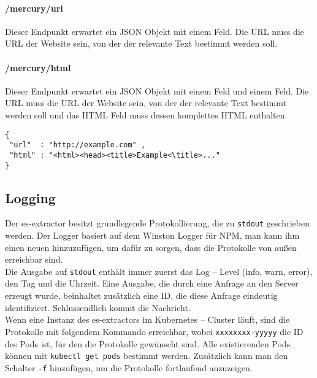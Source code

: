 \paragraph{/mercury/url} Dieser Endpunkt erwartet ein \ac{JSON} Objekt mit einem  Feld. Die URL muss die URL der Website sein, von der der relevante Text bestimmt werden soll.
\paragraph{/mercury/html} Dieser Endpunkt erwartet ein \ac{JSON} Objekt mit einem  Feld und einem  Feld. Die URL muss die URL der Website sein, von der der relevante Text bestimmt werden soll und das HTML Feld muss dessen komplettes HTML enthalten.
\begin{verbatim}
{
 "url"  : "http://example.com" , 
 "html" : "<html><head><title>Example<\title>..."
}
\end{verbatim}

\subsection{Logging}
Der es-extractor besitzt grundlegende Protokollierung, die zu \verb|stdout| geschrieben werden. Der Logger basiert auf dem Winston Logger für NPM, man kann ihm einen neuen  hinzuzufügen, um dafür zu sorgen, dass die Protokolle von außen erreichbar sind. \cite{winston2019} \\ 
Die Ausgabe auf \verb|stdout| enthält immer zuerst das Log – Level (info, warn, error), den Tag und die Uhrzeit. Eine Ausgabe, die durch eine Anfrage an den Server erzeugt wurde, beinhaltet zusätzlich eine ID, die diese Anfrage eindeutig identifiziert. Schlussendlich kommt die Nachricht. \\
Wenn eine Instanz des es-extractors im Kubernetes  – Cluster läuft, sind die Protokolle mit folgendem Kommando erreichbar, wobei \verb|xxxxxxxx-yyyyy| die ID des Pods ist, für den die Protokolle gewünscht sind. Alle existierenden Pods können mit \texttt{kubectl get pods} bestimmt werden.
Zusätzlich kann man den Schalter \verb|-f| hinzufügen, um die Protokolle fortlaufend anzuzeigen.
 
